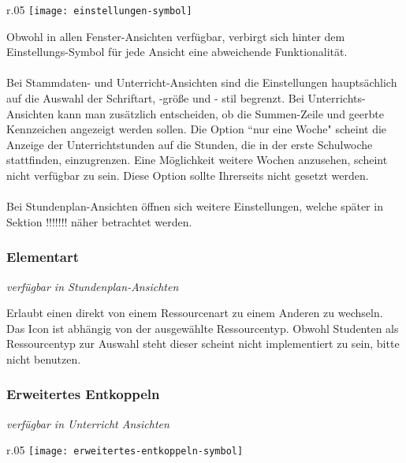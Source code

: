 \begin{wrapfigure}{r}{.05\textwidth}
	\vspace{-50pt}
	\texttt{[image: einstellungen-symbol]}
	\vspace{-35pt}
\end{wrapfigure}

\noindent
Obwohl in allen Fenster-Ansichten verfügbar, verbirgt sich hinter dem Einstellungs-Symbol für jede Ansicht eine abweichende Funktionalität.\\
\\
Bei Stammdaten- und Unterricht-Ansichten sind die Einstellungen hauptsächlich auf die Auswahl der Schriftart, -größe und - stil begrenzt. Bei Unterrichts-Ansichten kann man zusätzlich entscheiden, ob die Summen-Zeile und geerbte Kennzeichen angezeigt werden sollen. Die Option ``nur eine Woche" scheint die Anzeige der Unterrichtstunden auf die Stunden, die in der erste Schulwoche stattfinden, einzugrenzen. Eine Möglichkeit weitere Wochen anzusehen, scheint nicht verfügbar zu sein. Diese Option sollte Ihrerseits nicht gesetzt werden.\\
\\
Bei Stundenplan-Ansichten öffnen sich weitere Einstellungen, welche später in Sektion !!!!!!! näher betrachtet werden.\\

\subsubsection{Elementart}
{\small\textit{verfügbar in Stundenplan-Ansichten\\}\par}

\noindent %
Erlaubt einen direkt von einem Ressourcenart zu einem Anderen zu wechseln. Das Icon ist abhängig von der ausgewählte Ressourcentyp. Obwohl Studenten als Ressourcentyp zur Auswahl steht dieser scheint nicht implementiert zu sein, bitte nicht benutzen.

\subsubsection{Erweitertes Entkoppeln}
{\small\textit{verfügbar in Unterricht Ansichten\\}\par}

\begin{wrapfigure}{r}{.05\textwidth}
	\vspace{-50pt}
	\texttt{[image: erweitertes-entkoppeln-symbol]}
	\vspace{-35pt}
\end{wrapfigure}

